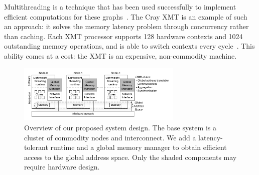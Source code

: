 \documentclass[10pt,nocopyrightspace,preprint]{sigplanconf}
\begin{document}





Multithreading is a technique that has been used successfully to
implement efficient computations for these
graphs~\cite{bader:bfsmta}. The Cray XMT is an example of such an
approach: it solves the memory latency problem through concurrency
rather than caching. Each XMT processor supports 128 hardware contexts
and 1024 outstanding memory operations, and is able to switch contexts
every cycle~\cite{tera, feo-xmt}. This ability comes at a cost: the
XMT is an expensive, non-commodity machine.

\begin{figure}[htbp]
  \begin{center}
    \vspace{-0.25in}
    \includegraphics[width=0.7\textwidth]{figures/system-overview.pdf}
    \vspace{-0.1in}
	\end{center}
	\caption{Overview of our proposed system design. The base
          system is a cluster of commodity nodes and interconnect. We
          add a latency-tolerant runtime and a global memory manager
          to obtain efficient access to the global address space. Only
          the shaded components may require hardware design.}
	\label{fig:system-overview}
\end{figure}
\end{document}
